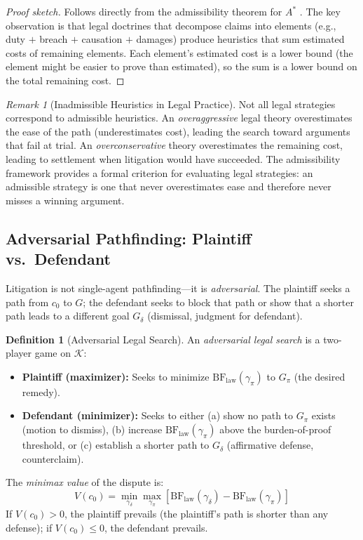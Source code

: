 \documentclass[12pt]{article}
\theoremstyle{definition}
\newtheorem{definition}[theorem]{Definition}
\theoremstyle{remark}
\newtheorem{remark}[theorem]{Remark}
\newcommand{\BF}{\mathrm{BF}}
\begin{document}
\begin{proof}[Proof sketch]
Follows directly from the admissibility theorem for $A^*$ \cite{hart1968}.  The key observation is that legal doctrines that decompose claims into elements (e.g., duty $+$ breach $+$ causation $+$ damages) produce heuristics that sum estimated costs of remaining elements.  Each element's estimated cost is a lower bound (the element might be easier to prove than estimated), so the sum is a lower bound on the total remaining cost.
\end{proof}

\begin{remark}[Inadmissible Heuristics in Legal Practice]
Not all legal strategies correspond to admissible heuristics.  An \emph{overaggressive} legal theory overestimates the ease of the path (underestimates cost), leading the search toward arguments that fail at trial.  An \emph{overconservative} theory overestimates the remaining cost, leading to settlement when litigation would have succeeded.  The admissibility framework provides a formal criterion for evaluating legal strategies: an admissible strategy is one that never overestimates ease and therefore never misses a winning argument.
\end{remark}

\subsection{Adversarial Pathfinding: Plaintiff vs.\ Defendant}

Litigation is not single-agent pathfinding---it is \emph{adversarial}.  The plaintiff seeks a path from $c_0$ to $G$; the defendant seeks to block that path or show that a shorter path leads to a different goal $G_\delta$ (dismissal, judgment for defendant).

\begin{definition}[Adversarial Legal Search]
An \emph{adversarial legal search} is a two-player game on $\mathcal{K}$:
\begin{itemize}
    \item \textbf{Plaintiff (maximizer):} Seeks to minimize $\BF_{\text{law}}(\gamma_\pi)$ to $G_\pi$ (the desired remedy).
    \item \textbf{Defendant (minimizer):} Seeks to either (a) show no path to $G_\pi$ exists (motion to dismiss), (b) increase $\BF_{\text{law}}(\gamma_\pi)$ above the burden-of-proof threshold, or (c) establish a shorter path to $G_\delta$ (affirmative defense, counterclaim).
\end{itemize}
The \emph{minimax value} of the dispute is:
\begin{equation}
V(c_0) = \min_{\gamma_\delta} \max_{\gamma_\pi} \left[ \BF_{\text{law}}(\gamma_\delta) - \BF_{\text{law}}(\gamma_\pi) \right]
\label{eq:minimax}
\end{equation}
If $V(c_0) > 0$, the plaintiff prevails (the plaintiff's path is shorter than any defense); if $V(c_0) \leq 0$, the defendant prevails.
\end{definition}
\end{document}
